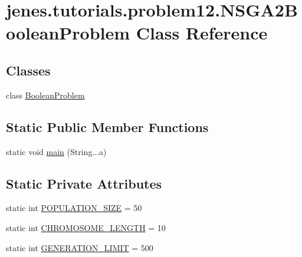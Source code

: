 \hypertarget{classjenes_1_1tutorials_1_1problem12_1_1_n_s_g_a2_boolean_problem}{\section{jenes.\-tutorials.\-problem12.\-N\-S\-G\-A2\-Boolean\-Problem Class Reference}
\label{classjenes_1_1tutorials_1_1problem12_1_1_n_s_g_a2_boolean_problem}
}
\subsection*{Classes}
\begin{DoxyCompactItemize}
\item 
class \hyperlink{classjenes_1_1tutorials_1_1problem12_1_1_n_s_g_a2_boolean_problem_1_1_boolean_problem}{Boolean\-Problem}
\end{DoxyCompactItemize}
\subsection*{Static Public Member Functions}
\begin{DoxyCompactItemize}
\item 
static void \hyperlink{classjenes_1_1tutorials_1_1problem12_1_1_n_s_g_a2_boolean_problem_a37194152e497fa12a3fca58d85eac4f4}{main} (String...\-a)
\end{DoxyCompactItemize}
\subsection*{Static Private Attributes}
\begin{DoxyCompactItemize}
\item 
static int \hyperlink{classjenes_1_1tutorials_1_1problem12_1_1_n_s_g_a2_boolean_problem_a61245a05aa3bdc3af9abe06303ed60e9}{P\-O\-P\-U\-L\-A\-T\-I\-O\-N\-\_\-\-S\-I\-Z\-E} = 50
\item 
static int \hyperlink{classjenes_1_1tutorials_1_1problem12_1_1_n_s_g_a2_boolean_problem_ad50e450643b9e7495f672b9d7be4d351}{C\-H\-R\-O\-M\-O\-S\-O\-M\-E\-\_\-\-L\-E\-N\-G\-T\-H} = 10
\item 
static int \hyperlink{classjenes_1_1tutorials_1_1problem12_1_1_n_s_g_a2_boolean_problem_a4befee9317942176ad978d9cf7ab414d}{G\-E\-N\-E\-R\-A\-T\-I\-O\-N\-\_\-\-L\-I\-M\-I\-T} = 500
\end{DoxyCompactItemize}


